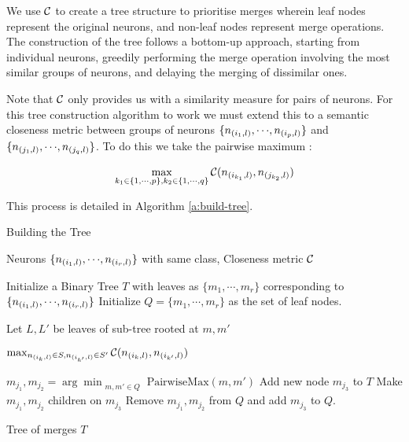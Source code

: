 We use $\mathcal{C}$ to create a tree structure to prioritise merges wherein leaf nodes
represent the original neurons, and 
non-leaf nodes represent merge operations. The construction of the tree 
follows a bottom-up approach, starting from individual neurons, 
greedily performing the merge operation involving the most similar groups of
neurons, and delaying the merging of dissimilar ones. 

Note that $\mathcal{C}$ only provides us
with a similarity measure for pairs of neurons. For this tree construction
algorithm to work we must extend this to a semantic closeness
metric between groups of neurons
$\{n_{(i_1,l)}, {\cdots}, n_{(i_p,l)}\}$ and $\{n_{(j_1,l)}, {\cdots},
n_{(j_q,l)}\}$. To do this we take the pairwise maximum : 

\begin{equation*}
\begin{aligned}
    \max_{k_1 \in \{1, {\cdots}, p\},
    k_2 \in \{1, {\cdots}, q\}} \mathcal{C}( n_{(i_{k_1},l)}, n_{(j_{k_2},l)} )
\end{aligned}
\end{equation*}


This process is detailed in Algorithm \ref{a:build-tree}.

\begin{algorithm}[H]
\caption{Building the Tree}
\label{a:build-tree}
\begin{algorithmic}[1]

    \Require Neurons $\{n_{(i_1,l)}, {\cdots}, n_{(i_r,l)}\}$ with same class,
    Closeness metric $\mathcal{C}$

    
    \State Initialize a Binary Tree $T$ with leaves as
        $\{m_1, {\cdots}, m_r\}$ corresponding to $\{ n_{(i_1,l)}, {\cdots},
        n_{(i_r,l)} \}$
    \State Initialize $Q=\{m_1, {\cdots}, m_r\}$ as the set of leaf nodes.

        
            \State Let $L, L'$ be leaves of sub-tree rooted at $m, m'$

            \Return $\max_{n_{(i_{k},l)} \in S, n_{(i_{k'},l)} \in S'} 
                \mathcal{C}( n_{(i_{k},l)}, n_{(i_{k'},l)} )$

    \EndFunction

        \State $m_{j_1}, m_{j_2} = \arg\min_{\substack{m, m' \in Q}} 
            \text{PairwiseMax}(m, m')$
        \State Add new node $m_{j_3}$ to $T$ 
        \State Make $m_{j_1}, m_{j_2}$ children on $m_{j_3}$
        \State Remove $m_{j_1}, m_{j_2}$ from $Q$ and add $m_{j_3}$ to $Q$.
    \EndWhile

    \Ensure Tree of merges $T$
\end{algorithmic}
\end{algorithm}

